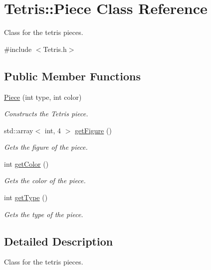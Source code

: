 \hypertarget{classTetris_1_1Piece}{}\section{Tetris\+:\+:Piece Class Reference}
\label{classTetris_1_1Piece}


Class for the tetris pieces.  




{\ttfamily \#include $<$Tetris.\+h$>$}

\subsection*{Public Member Functions}
\begin{DoxyCompactItemize}
\item 
\mbox{\hyperlink{classTetris_1_1Piece_a551b1f7851de00df380b5bab5180cbe1}{Piece}} (int type, int color)
\begin{DoxyCompactList}\small\item\em Constructs the Tetris piece. \end{DoxyCompactList}\item 
std\+::array$<$ int, 4 $>$ \mbox{\hyperlink{classTetris_1_1Piece_a616e7a5ae459622d8ee9ccbf727a6b90}{get\+Figure}} ()
\begin{DoxyCompactList}\small\item\em Gets the figure of the piece. \end{DoxyCompactList}\item 
int \mbox{\hyperlink{classTetris_1_1Piece_a86c8c8e4d4ea1fb4d89e262c72e28c4e}{get\+Color}} ()
\begin{DoxyCompactList}\small\item\em Gets the color of the piece. \end{DoxyCompactList}\item 
int \mbox{\hyperlink{classTetris_1_1Piece_a9d73e1c773c17d96fce8a84e7bf0b1bb}{get\+Type}} ()
\begin{DoxyCompactList}\small\item\em Gets the type of the piece. \end{DoxyCompactList}\end{DoxyCompactItemize}


\subsection{Detailed Description}
Class for the tetris pieces. 

